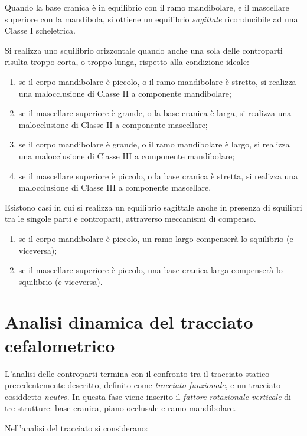 Quando la base cranica è in equilibrio con il ramo mandibolare, e il mascellare superiore con la mandibola, si ottiene un equilibrio \textit{sagittale} riconducibile ad una Classe I scheletrica.

Si realizza uno squilibrio orizzontale quando anche una sola delle controparti risulta troppo corta, o troppo lunga, rispetto alla condizione ideale:

\begin{enumerate}
\item se il corpo mandibolare è piccolo, o il ramo mandibolare è stretto, si realizza una malocclusione di Classe II a componente mandibolare;
\item se il mascellare superiore è grande, o la base cranica è larga, si realizza una malocclusione di Classe II a componente mascellare;
\item se il corpo mandibolare è grande, o il ramo mandibolare è largo, si realizza una malocclusione di Classe III a componente mandibolare;
\item se il mascellare superiore è piccolo, o la base cranica è stretta, si realizza una malocclusione di Classe III a componente mascellare.
\end{enumerate}

Esistono casi in cui si realizza un equilibrio sagittale anche in presenza di squilibri tra le singole parti e controparti, attraverso meccanismi di compenso.

\begin{enumerate}
\item se il corpo mandibolare è piccolo, un ramo largo compenserà lo squilibrio (e viceversa);
\item se il mascellare superiore è piccolo, una base cranica larga compenserà lo squilibrio (e viceversa).
\end{enumerate}

\section{Analisi dinamica del tracciato cefalometrico}
L'analisi delle controparti termina con il confronto tra il tracciato statico precedentemente descritto, definito come \textit{tracciato funzionale}, e un tracciato cosiddetto \textit{neutro}. In questa fase viene inserito il \textit{fattore rotazionale verticale} di tre strutture: base cranica, piano occlusale e ramo mandibolare.

Nell'analisi del tracciato si considerano:

